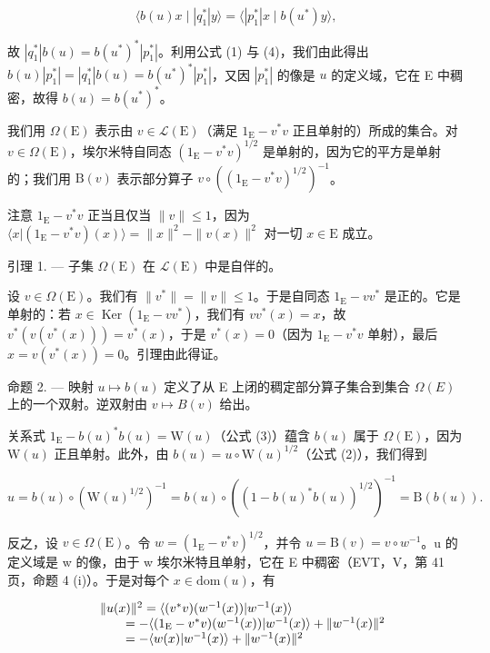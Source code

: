 \[
\langle b (u) x \mid | q _ {1} ^ {*} | y \rangle = \langle | p _ {1} ^ {*} | x \mid b (u ^ {*}) y \rangle ,
\]

故 \(|q_1^*|b(u) = b(u^*)^* |p_1^*|\)。利用公式 (1) 与 (4)，我们由此得出 \(b(u)|p_1^*| = |q_1^*|b(u) = b(u^*)^* |p_1^*|\)，又因 \(|p_1^*|\) 的像是 \(u\) 的定义域，它在 E 中稠密，故得 \(b(u) = b(u^*)^*\)。

我们用 \(\Omega(\mathrm{E})\) 表示由 \(v \in \mathcal{L}(\mathrm{E})\)（满足 \(1_{\mathrm{E}} - v^{*}v\) 正且单射的）所成的集合。对 \(v \in \Omega(\mathrm{E})\)，埃尔米特自同态 \((1_{\mathrm{E}} - v^{*}v)^{1/2}\) 是单射的，因为它的平方是单射的；我们用 \(\mathrm{B}(v)\) 表示部分算子 \(v \circ ((1_{\mathrm{E}} - v^{*}v)^{1/2})^{-1}\)。

注意 \(1_{\mathrm{E}} - v^{*}v\) 正当且仅当 \(\| v\| \leqslant 1\)，因为 \(\langle x|(1_{\mathrm{E}} - v^{*}v)(x)\rangle = \| x\| ^2 -\| v(x)\| ^2\) 对一切 \(x\in \mathrm{E}\) 成立。

引理 1. --- 子集 \(\Omega(\mathrm{E})\) 在 \(\mathcal{L}(\mathrm{E})\) 中是自伴的。

设 \(v \in \Omega(\mathrm{E})\)。我们有 \(\|v^{*}\| = \|v\| \leqslant 1\)。于是自同态 \(1_{\mathrm{E}} - vv^{*}\) 是正的。它是单射的：若 \(x \in \operatorname{Ker}(1_{\mathrm{E}} - vv^{*})\)，我们有 \(vv^{*}(x) = x\)，故 \(v^{*}(v(v^{*}(x))) = v^{*}(x)\)，于是 \(v^{*}(x) = 0\)（因为 \(1_{\mathrm{E}} - v^{*}v\) 单射），最后 \(x = v(v^{*}(x)) = 0\)。引理由此得证。

命题 2. — 映射 \(u \mapsto b(u)\) 定义了从 E 上闭的稠定部分算子集合到集合 \(\Omega(E)\) 上的一个双射。逆双射由 \(v \mapsto B(v)\) 给出。

关系式 \(1_{\mathrm{E}} - b(u)^{*}b(u) = \mathrm{W}(u)\)（公式 (3)）蕴含 \(b(u)\) 属于 \(\Omega (\mathrm{E})\)，因为 \(\mathrm{W}(u)\) 正且单射。此外，由 \(b(u) = u\circ \mathrm{W}(u)^{1 / 2}\)（公式 (2)），我们得到

\[
u = b (u) \circ (\mathrm{W} (u) ^ {1 / 2}) ^ {- 1} = b (u) \circ ((1 - b (u) ^ {*} b (u)) ^ {1 / 2}) ^ {- 1} = \mathrm{B} (b (u)).
\]

反之，设 \(v \in \Omega(\mathrm{E})\)。令 \(w = (1_{\mathrm{E}} - v^{*}v)^{1/2}\)，并令 \(u = \mathrm{B}(v) = v \circ w^{-1}\)。u 的定义域是 w 的像，由于 w 埃尔米特且单射，它在 E 中稠密（EVT，V，第 41 页，命题 4 (i)）。于是对每个 \(x \in \mathrm{dom}(u)\)，有

\[
\begin{array}{r l} & {\| u (x) \| ^ {2} = \langle (v ^ {*} v) (w ^ {- 1} (x)) | w ^ {- 1} (x) \rangle} \\ & {\qquad = - \langle (1 _ {\mathrm{E}} - v ^ {*} v) (w ^ {- 1} (x)) | w ^ {- 1} (x) \rangle + \| w ^ {- 1} (x) \| ^ {2}} \\ & {\qquad = - \langle w (x) | w ^ {- 1} (x) \rangle + \| w ^ {- 1} (x) \| ^ {2}} \end{array}
\]

